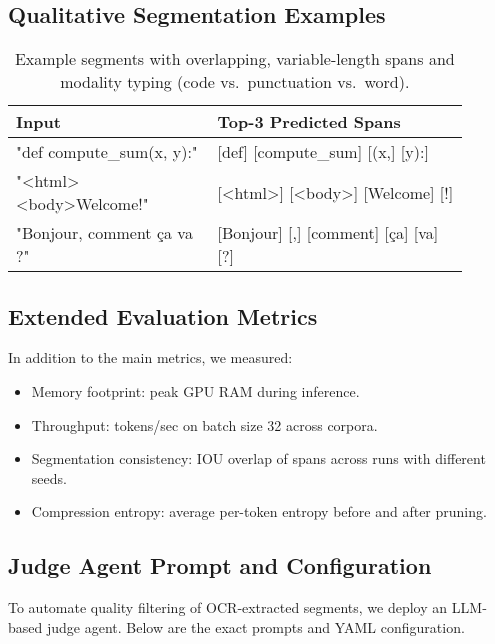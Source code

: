 \subsection{Qualitative Segmentation Examples}
\label{sec:qual-examples}

\begin{table}[H]
	\centering
	\begin{tabular}{@{}p{0.4\linewidth}p{0.5\linewidth}@{}}
		\toprule
		Input & Top-3 Predicted Spans \\
		\midrule
		"def compute\_sum(x, y):"       & [def] [compute\_sum] [(x,] [y):] \\
		"<html><body>Welcome!"         & [<html>] [<body>] [Welcome] [!] \\
		"Bonjour, comment ça va ?"      & [Bonjour] [,] [comment] [ça] [va] [?] \\
		\bottomrule
	\end{tabular}
	\caption{Example segments with overlapping, variable-length spans and modality typing (code vs.\ punctuation vs.\ word).}
\end{table}

\subsection{Extended Evaluation Metrics}
\label{sec:extended-metrics}

In addition to the main metrics, we measured:
\begin{itemize}[leftmargin=1.5em]
	\item Memory footprint: peak GPU RAM during inference.
	\item Throughput: tokens/sec on batch size 32 across corpora.
	\item Segmentation consistency: IOU overlap of spans across runs with different seeds.
	\item Compression entropy: average per-token entropy before and after pruning.
\end{itemize}

\subsection{Judge Agent Prompt and Configuration}
\label{sec:judge-agent-config}

To automate quality filtering of OCR‐extracted segments, we deploy an LLM‐based judge agent. Below are the exact prompts and YAML configuration.

